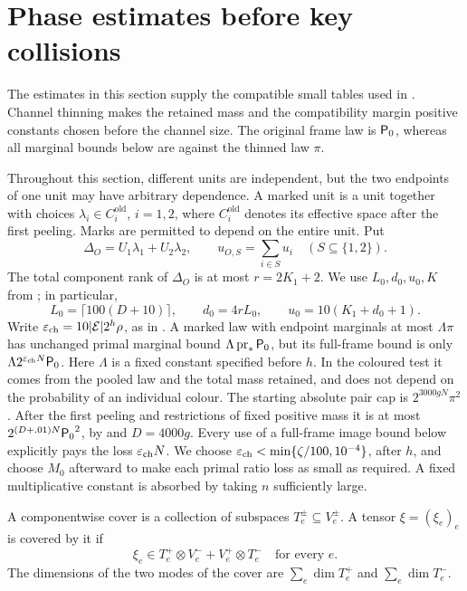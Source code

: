 \section{Phase estimates before key collisions}
\label{sec:phases}

The estimates in this section supply the compatible small tables
used in .  Channel thinning makes the
retained mass and the compatibility margin positive constants chosen
before the channel size.  The original frame law is \({\mathsf P_0}\),
whereas all marginal bounds below are against the thinned law \(\pi\).

Throughout this section, different units are independent, but the two
endpoints of one unit may have arbitrary dependence.  A marked unit is
a unit together with choices
\(\lambda_i\in C_i^{\mathrm{old}}\), \(i=1,2\), where
\(C_i^{\mathrm{old}}\) denotes its effective space after the first
peeling.  Marks are permitted to depend on the entire unit.  Put
\begin{equation}
 \Delta_O=U_1\lambda_1+U_2\lambda_2,\qquad
 u_{O,S}=\sum_{i\in S}u_i\quad(S\subseteq\{1,2\}).
 \label{eq:delta-phase}
\end{equation}
The total component rank of \(\Delta_O\) is at most
\(r=2K_1+2\).  We use \(L_0,d_0,u_0,K\) from
; in particular,
\[
 L_0=\lceil100(D+10)\rceil,\qquad d_0=4rL_0,\qquad
 u_0=10(K_1+d_0+1).
\]
Write \(\varepsilon_{\rm ch}=10|\mathcal E|2^h\rho\), as in
.  A marked law with endpoint marginals
at most \(\Lambda\pi\) has unchanged primal marginal bound
\(\Lambda\operatorname{pr}_*{\mathsf P_0}\), but its full-frame bound is only
\(\Lambda2^{\varepsilon_{\rm ch}N}{\mathsf P_0}\).
Here \(\Lambda\) is a fixed constant specified before \(h\).
In the coloured test it comes from the pooled law and the total mass
retained, and does not depend on the probability of an individual
colour.  The starting absolute pair cap is \(2^{3000gN}\pi^2\).
After the first peeling and restrictions of fixed positive mass it
is at most \(2^{(D+.01)N}{\mathsf P_0}^2\), by
 and \(D=4000g\).
Every use of a full-frame image bound below explicitly pays the
loss \(\varepsilon_{\rm ch}N\).  We choose
\(\varepsilon_{\rm ch}<\min\{\zeta/100,10^{-4}\}\), after \(h\),
and choose \(M_0\) afterward to make each primal ratio loss as small
as required.  A fixed multiplicative constant is absorbed by taking
\(n\) sufficiently large.

\begin{definition}
A componentwise cover is a collection of subspaces
\(T_e^\pm\subseteq V_e^\pm\).  A tensor \(\xi=(\xi_e)_e\) is covered
by it if
\[
 \xi_e\in T_e^+\otimes V_e^-+V_e^+\otimes T_e^-
 \quad\text{for every }e.
\]
The dimensions of the two modes of the cover are
\(\sum_e\dim T_e^+\) and \(\sum_e\dim T_e^-\).
\end{definition}

